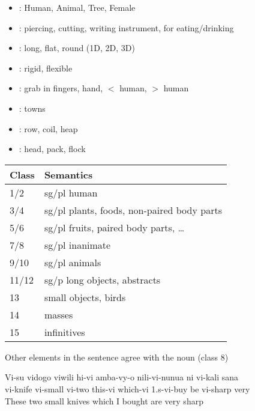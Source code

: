 \documentclass[headrule,footrule]{foils}
\begin{document}
\begin{itemize}
\item {}: Human, Animal, Tree, Female
\item {}: piercing, cutting, writing instrument, for eating/drinking
\item {}: long, flat, round (1D, 2D, 3D)
\item {}: rigid, flexible
\item {}: grab in fingers, hand, $<$ human, $>$ human
\item {}: towns
\item {}: row, coil, heap
\item {}: head, pack, flock
\end{itemize}


\begin{tabular}{ll}
  Class &  Semantics \\
\hline
1/2 	& sg/pl   human \\
3/4 	& sg/pl   plants, foods, non-paired body parts \\
5/6 	& sg/pl  fruits, paired body parts, \ldots \\
7/8 	& sg/pl  inanimate \\
9/10 	& sg/pl  animals \\
11/12 	& sg/p   long objects, abstracts \\
13      & small objects, birds \\
14      & masses \\
15      & infinitives
\end{tabular}
\newpage
Other elements in the sentence agree with the noun (class 8)
\begin{exe}
  \ex \gll Vi-su vidogo viwili hi-vi amba-vy-o nili-vi-nunua ni vi-kali sana \\
  vi-knife vi-small vi-two this-vi which-vi 1.s-vi-buy be vi-sharp very \\
\trans These two small knives which I bought are very sharp
\end{exe}
\end{document}
